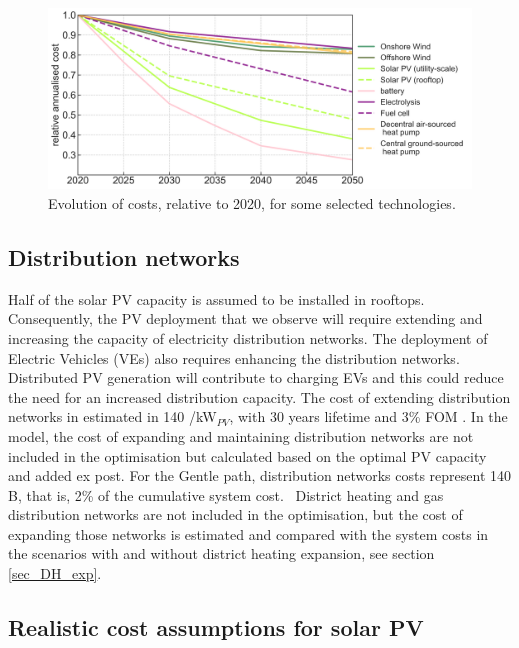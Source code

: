 \documentclass[3p]{elsarticle} %
\begin{document}
\begin{figure}[!h]
\centering
\includegraphics[width=12cm]{figures/cost_evolution.png}
\caption{Evolution of costs, relative to 2020, for some selected technologies. } \label{fig_cost_evolution} 
\end{figure}
 

\FloatBarrier
\subsection{Distribution networks} 

Half of the solar PV capacity is assumed to be installed in rooftops. Consequently, the PV deployment that we observe will require extending and increasing the capacity of electricity distribution networks. The deployment of Electric Vehicles (VEs) also requires enhancing the distribution networks. Distributed PV generation will contribute to charging EVs and this could reduce the need for an increased distribution capacity. The cost of extending distribution networks in estimated in 140 \EUR/kW$_{PV}$, with 30 years lifetime and 3\% FOM \cite{Sterchele_2020, DEA_2019}. In the model, the cost of expanding and maintaining distribution networks are not included in the optimisation but calculated based on the optimal PV capacity and added ex post. For the Gentle path, distribution networks costs represent 140 B\EUR, that is, 2\% of the cumulative system cost.  \
District heating and gas distribution networks are not included in the optimisation, but the cost of expanding those networks is estimated and compared with the system costs in the scenarios with and without district heating expansion, see section \ref{sec_DH_exp}. 

\subsection{Realistic cost assumptions for solar PV} 
\end{document}
